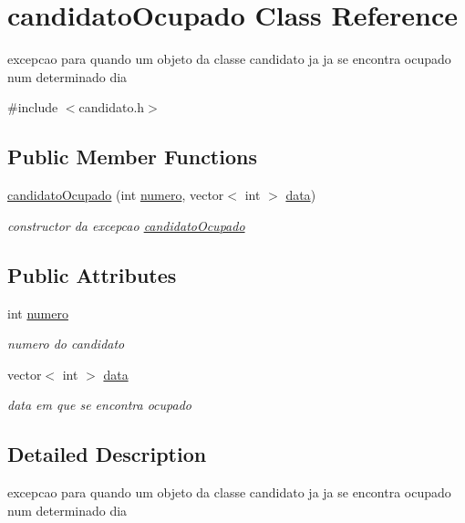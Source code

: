 \hypertarget{classcandidatoOcupado}{}\section{candidato\+Ocupado Class Reference}
\label{classcandidatoOcupado}


excepcao para quando um objeto da classe candidato ja ja se encontra ocupado num determinado dia  




{\ttfamily \#include $<$candidato.\+h$>$}

\subsection*{Public Member Functions}
\begin{DoxyCompactItemize}
\item 
\hyperlink{classcandidatoOcupado_af70899618b9cd4cd71e89d0b56f39e6a}{candidato\+Ocupado} (int \hyperlink{classcandidatoOcupado_a00c7bebff807b8f9bf1ff5f593e3d5da}{numero}, vector$<$ int $>$ \hyperlink{classcandidatoOcupado_ae51bfe0085756c5cedc92a7716c7a88b}{data})
\begin{DoxyCompactList}\small\item\em constructor da excepcao \hyperlink{classcandidatoOcupado}{candidato\+Ocupado} \end{DoxyCompactList}\end{DoxyCompactItemize}
\subsection*{Public Attributes}
\begin{DoxyCompactItemize}
\item 
int \hyperlink{classcandidatoOcupado_a00c7bebff807b8f9bf1ff5f593e3d5da}{numero}
\begin{DoxyCompactList}\small\item\em numero do candidato \end{DoxyCompactList}\item 
vector$<$ int $>$ \hyperlink{classcandidatoOcupado_ae51bfe0085756c5cedc92a7716c7a88b}{data}
\begin{DoxyCompactList}\small\item\em data em que se encontra ocupado \end{DoxyCompactList}\end{DoxyCompactItemize}


\subsection{Detailed Description}
excepcao para quando um objeto da classe candidato ja ja se encontra ocupado num determinado dia 

